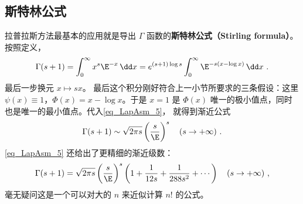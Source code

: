 \subsection{斯特林公式}
拉普拉斯方法最基本的应用就是导出 $\Gamma$ 函数的\textbf{斯特林公式（Stirling formula）}。 按照定义，
\[
  \Gamma(s+1)
  =\int_0^\infty x^s\E^{-x}\,\dd x
  =e^{(s+1)\log s}\int_0^\infty \E^{-s(x-\log x)}\,\dd x~.
\]
最后一步换元 $x\mapsto sx$。 最后这个积分刚好符合上一小节所要求的三条假设：这里 $\psi(x)\equiv1$，$\Phi(x)=x-\log x$。于是 $x=1$ 是 $\Phi(x)$ 唯一的极小值点，同时也是唯一的最小值点。代入\autoref{eq_LapAsm_5}， 就得到渐近公式
\[
  \Gamma(s+1)\sim\sqrt{2\pi s}\left(\frac{s}{\E}\right)^s\quad (s\to+\infty)~.
\]
\autoref{eq_LapAsm_5} 还给出了更精细的渐近级数：
\[
  \Gamma(s+1)
  =\sqrt{2\pi s}\left({s\over \E}\right)^s
  \left(
   1+{1\over12s}+{1\over288 s^2}+ \cdots
  \right)\quad (s\to+\infty)~,
\]
毫无疑问这是一个可以对大的 $n$ 来近似计算 $n!$ 的公式。
